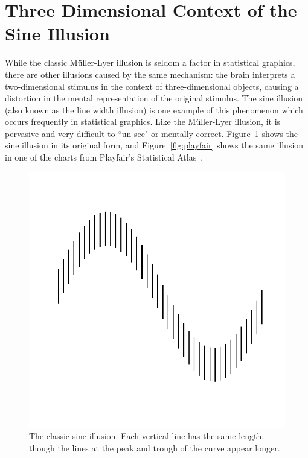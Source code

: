 \documentclass[journal]{vgtc}\usepackage{graphicx, color}
\begin{document}
\section{Three Dimensional Context of the Sine Illusion}
While the classic M\"uller-Lyer illusion is seldom a factor in statistical graphics, there are other illusions caused by the same mechanism: the brain interprets a two-dimensional stimulus in the context of three-dimensional objects, causing a distortion in the mental representation of the original stimulus. The sine illusion (also known as the line width illusion) is one example of this phenomenon which occurs frequently in statistical graphics. Like the M\"uller-Lyer illusion, it is pervasive and very difficult to ``un-see" or mentally correct. Figure~\ref{fig:sineillusion} shows the sine illusion in its original form, and Figure~\ref{fig:playfair} shows the same illusion in one of the charts from Playfair's Statistical Atlas~\citep{playfair}.
\begin{figure}[h!t]\centering
\includegraphics[keepaspectratio=TRUE,width=\linewidth]{figure/fig-sinedemo1}
\caption{The classic sine illusion. Each vertical line has the same length, though the lines at the peak and trough of the curve appear longer.}\label{fig:sineillusion}
\end{figure}
\end{document}
